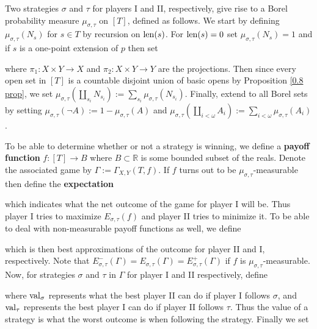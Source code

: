 \qquad Two strategies $\sigma$ and $\tau$ for players I and II, respectively, give rise to a Borel probability measure $\mu_{\sigma,\tau}$ on $[T]$, defined as follows. We start by defining $\mu_{\sigma,\tau}(N_s)$ for $s\in T$ by recursion on $\operatorname{len}(s)$. For $\operatorname{len}(s)=0$ set $\mu_{\sigma,\tau}(N_s)=1$ and if $s$ is a one-point extension of $p$ then set

where $\pi_1:X\times Y\to X$ and $\pi_2:X\times Y\to Y$ are the projections. Then since every open set in $[T]$ is a countable disjoint union of basic opens by Proposition \ref{0.8 prop}, we set $\mu_{\sigma,\tau}(\coprod_{s_i}N_{s_i}):=\sum_{s_i}\mu_{\sigma,\tau}(N_{s_i})$. Finally, extend to all Borel sets by setting $\mu_{\sigma,\tau}(\lnot A):=1-\mu_{\sigma,\tau}(A)$ and $\mu_{\sigma,\tau}(\coprod_{i<\omega}A_i):=\sum_{i<\omega}\mu_{\sigma,\tau}(A_i)$.

\qquad To be able to determine whether or not a strategy is winning, we define a \textbf{payoff function} $f:[T]\to B$ where $B\subset\mathbb{R}$ is some bounded subset of the reals. Denote the associated game by $\Gamma:=\Gamma_{X,Y}(T,f)$. If $f$ turns out to be $\mu_{\sigma,\tau}$-measurable then define the \textbf{expectation}

which indicates what the net outcome of the game for player I will be. Thus player I tries to maximize $E_{\sigma,\tau}(f)$ and player II tries to minimize it. To be able to deal with non-measurable payoff functions as well, we define

which is then best approximations of the outcome for player II and I, respectively. Note that $E_{\sigma,\tau}^-(\Gamma)=E_{\sigma,\tau}(\Gamma)=E_{\sigma,\tau}^+(\Gamma)$ if $f$ is $\mu_{\sigma,\tau}$-measurable. Now, for strategies $\sigma$ and $\tau$ in $\Gamma$ for player I and II respectively, define

where $\operatorname{val}_\sigma$ represents what the best player II can do if player I follows $\sigma$, and $\operatorname{val}_\tau$ represents the best player I can do if player II follows $\tau$. Thus the value of a strategy is what the worst outcome is when following the strategy. Finally we set

